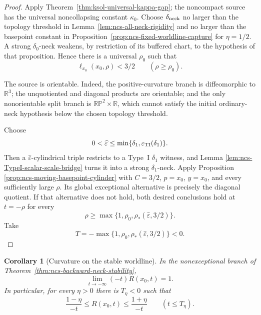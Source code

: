 \documentclass[10pt]{coll-l}
\newcommand{\R}{\mathbb{R}}
\newtheorem{corollary}[theorem]{Corollary}
\theoremstyle{definition}
\theoremstyle{remark}
\numberwithin{section}{chapter}
\numberwithin{equation}{chapter}
\begin{document}
\begin{proof}
Apply Theorem~\ref{thm:ksol-universal-kappa-gap}; the noncompact source has
the universal noncollapsing constant $\kappa_0$.  Choose
$\delta_{\rm neck}$ no larger than the topology threshold in
Lemma~\ref{lem:ncs-all-neck-rigidity} and no larger than the basepoint
constant in Proposition~\ref{prop:ncs-fixed-worldline-capture} for
$\eta=1/2$.  A strong $\delta_0$-neck weakens, by restriction of its
buffered chart, to the hypothesis of that proposition.  Hence there is a
universal $\rho_0$ such that
\begin{equation}
                         \ell_{x_0}(x_0,\rho)<3/2
                         \qquad(\rho\geq\rho_0).        \label{eq:ncs-fixed-worldline-three-halves}
\end{equation}

The source is orientable.  Indeed, the positive-curvature branch is
diffeomorphic to $\R^3$; the unquotiented and diagonal products are
orientable; and the only nonorientable split branch is
$\mathbb{RP}^2\times\R$, which cannot satisfy the initial ordinary-neck
hypothesis below the chosen topology threshold.

Choose
\begin{equation}
 0<\widehat\varepsilon\leq
 \min\{\delta_1,\varepsilon_{\rm TI}(\delta_1)\}.      \label{eq:ncs-stability-epsilon-choice}
\end{equation}
Then a $\widehat\varepsilon$-cylindrical triple restricts to a Type~I
$\delta_1$ witness, and Lemma
\ref{lem:ncs-TypeI-scalar-scale-bridge} turns it into a strong
$\delta_1$-neck.  Apply Proposition
\ref{prop:ncs-moving-basepoint-cylinder} with
$C=3/2$, $p=x_0$, $y=x_0$, and every sufficiently large $\rho$.  Its
global exceptional alternative is precisely the diagonal quotient.  If
that alternative does not hold, both desired conclusions hold at
$t=-\rho$ for every
\begin{equation}
 \rho\geq\max\{1,\rho_0,\rho_*(\widehat\varepsilon,3/2)\}.
\end{equation}
Take
\begin{equation}
 T=-\max\{1,\rho_0,\rho_*(\widehat\varepsilon,3/2)\}<0.       \label{eq:ncs-stability-time-choice}
\end{equation}
\end{proof}

\begin{corollary}[Curvature on the stable worldline]
\label{cor:ncs-neck-worldline-TypeI-curvature}
In the nonexceptional branch of
Theorem~\ref{thm:ncs-backward-neck-stability},
\begin{equation}
                       \lim_{t\to-\infty}(-t)R(x_0,t)=1.       \label{eq:ncs-worldline-TypeI-limit}
\end{equation}
In particular, for every $\eta>0$ there is $T_\eta<0$ such that
\begin{equation}
 \frac{1-\eta}{-t}\leq R(x_0,t)\leq\frac{1+\eta}{-t}
                         \qquad(t\leq T_\eta).          \label{eq:ncs-worldline-TypeI-two-sided}
\end{equation}
\end{corollary}
\end{document}
